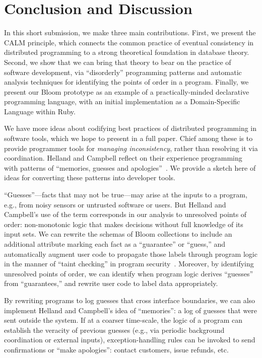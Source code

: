 \section{Conclusion and Discussion}
\label{sec:conclusion}
In this short submission, we make three main contributions.  First, we present
the CALM principle, which connects the common practice of eventual consistency
in distributed programming to a strong theoretical foundation in database
theory.  Second, we show that we can bring that theory to bear on the practice
of software development, via ``disorderly'' programming patterns and automatic
analysis techniques for identifying the points of
order in a program. Finally, we present our Bloom prototype as an example of a
practically-minded declarative programming language, with an initial
implementation as a Domain-Specific Language within Ruby.

We have more ideas about codifying best practices of distributed programming in software tools, which we hope to present in a full paper.  Chief among these is to provide programmer tools for \emph{managing inconsistency}, rather than resolving it via coordination.  Helland and Campbell reflect on their experience programming with patterns of ``memories, guesses and apologies''~\cite{quicksand}.  We provide a sketch here of ideas for converting these patterns into developer tools.

``Guesses''---facts that may not be true---may arise at the inputs to a program, e.g., from noisy sensors or untrusted software or users.  But Helland and Campbell's use of the term corresponds in our analysis to unresolved points of order: non-monotonic logic that makes decisions without full knowledge of its input sets.  We can rewrite the schemas of Bloom collections to include an additional attribute marking each fact as a ``guarantee'' or ``guess,'' and automatically augment user code to propagate those labels through program logic in the manner of ``taint checking'' in program security~\cite{taint,asbestos}.  Moreover, by identifying unresolved points of order, we can identify when program logic derives ``guesses'' from ``guarantees,'' and rewrite user code to label data appropriately.

By rewriting programs to log guesses that cross interface boundaries, we can also implement Helland and Campbell's idea of ``memories'': a log of guesses that were sent outside the system.  If at a coarser time-scale, the logic of a program can establish the veracity of previous guesses (e.g., via periodic background coordination or external inputs), exception-handling rules can be invoked to send confirmations or ``make apologies'': contact customers, issue refunds, etc.

